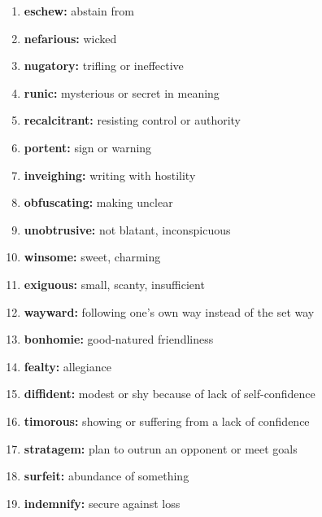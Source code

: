 \documentclass{article}
\begin{document}
\begin{enumerate}
    \item \textbf{eschew: }{abstain from}
    \item \textbf{nefarious: }{wicked}
    \item \textbf{nugatory: }{trifling or ineffective}
    \item \textbf{runic: }{mysterious or secret in meaning}
    \item \textbf{recalcitrant: }{resisting control or authority}
    \item \textbf{portent: }{sign or warning}
    \item \textbf{inveighing: }{writing with hostility}
    \item \textbf{obfuscating: }{making unclear}
    \item \textbf{unobtrusive: }{not blatant, inconspicuous}
    \item \textbf{winsome: }{sweet, charming}
    \item \textbf{exiguous: }{small, scanty, insufficient}
    \item \textbf{wayward: }{following one's own way instead of the set way}
    \item \textbf{bonhomie: }{good-natured friendliness}
    \item \textbf{fealty: }{allegiance}
    \item \textbf{diffident: }{modest or shy because of lack of self-confidence}
    \item \textbf{timorous: }{showing or suffering from a lack of confidence}
    \item \textbf{stratagem: }{plan to outrun an opponent or meet goals}
    \item \textbf{surfeit: }{abundance of something}
    \item \textbf{indemnify: }{secure against loss}
    
\end{enumerate}
\end{document}
